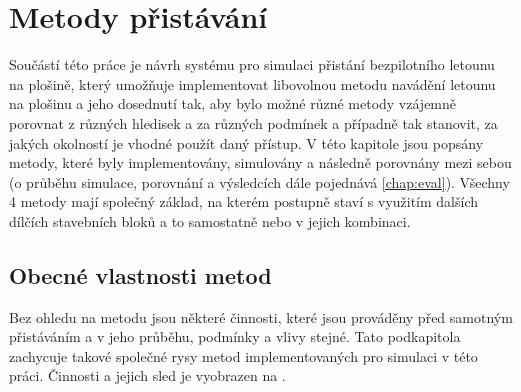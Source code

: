 \chapter{Metody přistávání}
    Součástí této práce je návrh systému pro simulaci přistání bezpilotního letounu na plošině, který umožňuje implementovat libovolnou metodu navádění letounu na plošinu a jeho dosednutí tak, aby bylo možné různé metody vzájemně porovnat z různých hledisek a za různých podmínek a případně tak stanovit, za jakých okolností je vhodné použít daný přístup. V této kapitole jsou popsány metody, které byly implementovány, simulovány a následně porovnány mezi sebou (o průběhu simulace, porovnání a výsledcích dále pojednává \cref{chap:eval}). Všechny 4 metody mají společný základ, na kterém postupně staví s využitím dalších dílčích stavebních bloků a to samostatně nebo v jejich kombinaci.

    \section{Obecné vlastnosti metod} \label{sec:generalalg}
    Bez ohledu na metodu jsou některé činnosti, které jsou prováděny před samotným přistáváním a v jeho průběhu, podmínky a vlivy stejné. Tato podkapitola zachycuje takové společné rysy metod implementovaných pro simulaci v této práci. Činnosti a jejich sled je vyobrazen na .

